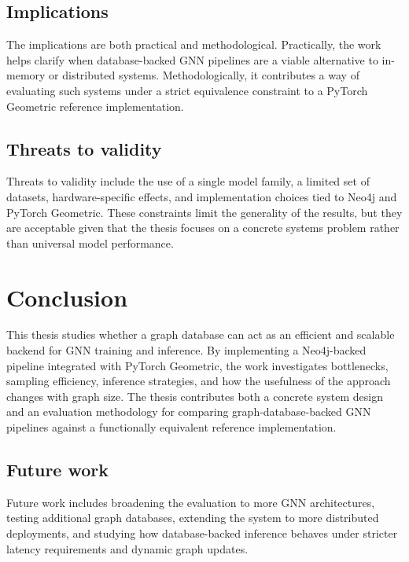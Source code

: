\documentclass[PhD,single]{uclathes}
\begin{document}
\section{Implications}
The implications are both practical and methodological. Practically, the work
helps clarify when database-backed GNN pipelines are a viable alternative to
in-memory or distributed systems. Methodologically, it contributes a way of
evaluating such systems under a strict equivalence constraint to a PyTorch
Geometric reference implementation.

\section{Threats to validity}
Threats to validity include the use of a single model family, a limited set of
datasets, hardware-specific effects, and implementation choices tied to Neo4j
and PyTorch Geometric. These constraints limit the generality of the results,
but they are acceptable given that the thesis focuses on a concrete systems
problem rather than universal model performance.

\chapter{Conclusion}

This thesis studies whether a graph database can act as an efficient and
scalable backend for GNN training and inference. By implementing a Neo4j-backed
pipeline integrated with PyTorch Geometric, the work investigates bottlenecks,
sampling efficiency, inference strategies, and how the usefulness of the
approach changes with graph size. The thesis contributes both a concrete system
design and an evaluation methodology for comparing graph-database-backed GNN
pipelines against a functionally equivalent reference implementation.

\section{Future work}
Future work includes broadening the evaluation to more GNN architectures,
testing additional graph databases, extending the system to more distributed
deployments, and studying how database-backed inference behaves under stricter
latency requirements and dynamic graph updates.


% 
% 
\end{document}

